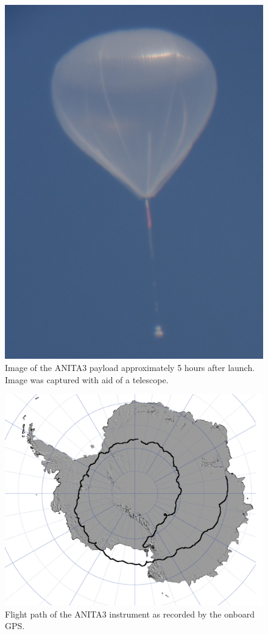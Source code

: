 		
\begin{figure}
\centering
	\includegraphics[height=0.9\textheight]{figures/CelestronBalloon}
	\caption{Image of the ANITA3 payload approximately 5 hours after launch. Image was captured with aid of a telescope. }
	\label{fig:Balloon}
\end{figure}

\begin{figure}
\centering
	\includegraphics[width=\textwidth]{figures/A3FlightPath}
	\caption{Flight path of the ANITA3 instrument as recorded by the onboard GPS.}
	\label{fig:A3FlightPath}
\end{figure}

